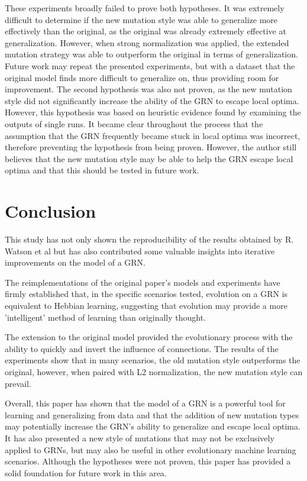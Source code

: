 \documentclass[twocolumn,a4paper,11pt]{article}
\begin{document}
    These experiments broadly failed to prove both hypotheses. It was extremely difficult to determine if the new mutation style was able to generalize more effectively than the original, as the original was already extremely effective at generalization. However, when strong normalization was applied, the extended mutation strategy was able to outperform the original in terms of generalization. Future work may repeat the presented experiments, but with a dataset that the original model finds more difficult to generalize on, thus providing room for improvement. The second hypothesis was also not proven, as the new mutation style did not significantly increase the ability of the GRN to escape local optima. However, this hypothesis was based on heuristic evidence found by examining the outputs of single runs. It became clear throughout the process that the assumption that the GRN frequently became stuck in local optima was incorrect, therefore preventing the hypothesis from being proven. However, the author still believes that the new mutation style may be able to help the GRN escape local optima and that this should be tested in future work.
    
    \section{Conclusion}
    This study has not only shown the reproducibility of the results obtained by R. Watson et al \cite{original-paper} but has also contributed some valuable insights into iterative improvements on the model of a GRN.

    The reimplementations of the original paper's models and experiments have firmly established that, in the specific scenarios tested, evolution on a GRN is equivalent to Hebbian learning, suggesting that evolution may provide a more 'intelligent' method of learning than originally thought.

    The extension to the original model provided the evolutionary process with the ability to quickly and invert the influence of connections. The results of the experiments show that in many scenarios, the old mutation style outperforms the original, however, when paired with L2 normalization, the new mutation style can prevail.

    Overall, this paper has shown that the model of a GRN is a powerful tool for learning and generalizing from data and that the addition of new mutation types may potentially increase the GRN's ability to generalize and escape local optima. It has also presented a new style of mutations that may not be exclusively applied to GRNs, but may also be useful in other evolutionary machine learning scenarios. Although the hypotheses were not proven, this paper has provided a solid foundation for future work in this area.

    
\end{document}
